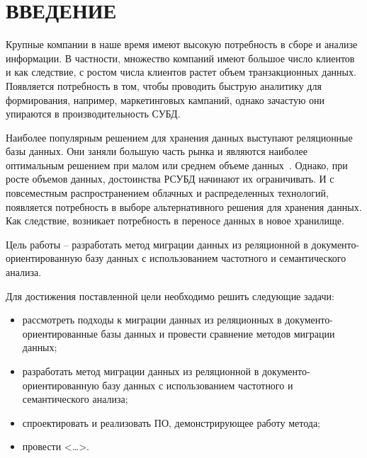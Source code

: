 \chapter*{ВВЕДЕНИЕ}

Крупные компании в наше время имеют высокую потребность в сборе
и анализе информации. В частности, множество компаний имеют большое
число клиентов и как следствие, с ростом числа клиентов растет объем
транзакционных данных. Появляется потребность в том, чтобы проводить
быструю аналитику для формирования, например, маркетинговых кампаний,
однако зачастую они упираются в производительность СУБД.

Наиболее популярным решением для хранения данных выступают реляционные базы данных. Они заняли большую часть рынка и являются наиболее
оптимальным решением при малом или среднем объеме данных~\cite{db_rating}. 
Однако, при росте объемов данных, достоинства РСУБД начинают их ограничивать.
И с повсеместным распространением облачных и распределенных технологий,
появляется потребность в выборе альтернативного решения для хранения данных.
Как следствие, возникает потребность в переносе данных в новое хранилище.


Цель работы – разработать метод миграции данных из реляционной в
документо-ориентированную базу данных с
использованием частотного и семантического
анализа.

Для достижения поставленной цели необходимо решить следующие
задачи:
\begin{itemize}[label=---]
    \item рассмотреть подходы к миграции данных из реляционных в документо-ориентированные
    базы данных и провести сравнение методов миграции данных;
    \item разработать метод миграции данных из реляционной в документо-ориентированную базу данных с
    использованием частотного и семантического анализа;
    \item спроектировать и реализовать ПО, демонстрирующее работу метода;
    \item провести <\dots>.
\end{itemize}

